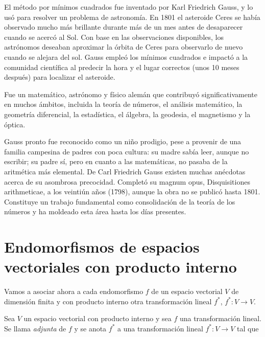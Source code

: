{\begin{remark}
 El método por mínimos cuadrados fue inventado por Karl Friedrich Gauss, y lo usó para resolver un problema de astronomía. En 1801 el asteroide Ceres se había observado mucho más brillante durante más de un mes antes de desaparecer cuando se acercó al Sol. Con base en las observaciones disponibles, los astrónomos deseaban aproximar la órbita de Ceres para observarlo de nuevo cuando se alejara del sol. Gauss empleó los mínimos cuadrados e impactó a la comunidad científica al predecir la hora y el lugar correctos (unos 10 meses después) para localizar el asteroide.
\end{remark}


\begin{parchment}{ Fue un matemático, astrónomo y físico alemán que contribuyó significativamente en muchos ámbitos, incluida la teoría de números, el análisis matemático, la geometría diferencial, la estadística, el álgebra, la geodesia, el magnetismo y la óptica. 

Gauss pronto fue reconocido como un niño prodigio, pese a provenir de una familia campesina de padres con poca cultura: su madre sabía leer, aunque no escribir; su padre sí, pero en cuanto a las matemáticas, no pasaba de la aritmética más elemental. De Carl Friedrich Gauss existen muchas anécdotas acerca de su asombrosa precocidad. Completó su magnum opus, Disquisitiones arithmeticae, a los veintiún años (1798), aunque la obra no se publicó hasta 1801. Constituye un trabajo fundamental como consolidación de la teoría de los números y ha moldeado esta área hasta los días presentes. \cite{gauss} }
\end{parchment} 


\section{Endomorfismos de espacios vectoriales con producto interno}

Vamos a asociar ahora a cada endomorfismo  $f$ de un espacio vectorial $V$  de dimensión finita y con producto interno otra transformación lineal $f ^{*}$, $f ^{*}: V \rightarrow V  $.


\bigskip
\begin{definition}


Sea $V$ un espacio vectorial  con producto interno y sea $f$ una transformación lineal. Se llama \textit{adjunta} de $f$ y se anota  $f ^{*}$ a una transformación lineal $f ^{*}: V \rightarrow V  $ tal que 


\end{definition}}
